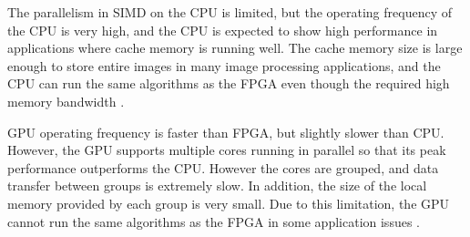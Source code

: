 
The parallelism in SIMD on the CPU is limited, but the operating frequency of the CPU is very high, and the CPU is expected to show high performance in applications where cache memory is running well. The cache memory size is large enough to store entire images in many image processing applications, and the CPU can run the same algorithms as the FPGA even though the required high memory bandwidth \cite{lb:asano}.


GPU operating frequency is faster than FPGA, but slightly slower than CPU. However, the GPU supports multiple cores running in parallel so that its peak performance outperforms the CPU. However the cores are grouped, and data transfer between groups is extremely slow. In addition, the size of the local memory provided by each group is very small. Due to this limitation, the GPU cannot run the same algorithms as the FPGA in some application issues \cite{lb:asano}.


